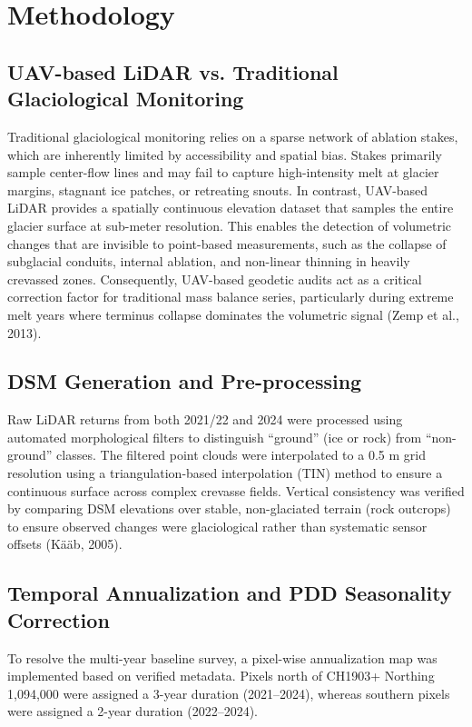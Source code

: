 \documentclass[12pt, a4paper]{article}
\begin{document}
	\section{Methodology}
	
	\subsection{UAV-based LiDAR vs. Traditional Glaciological Monitoring}
	Traditional glaciological monitoring relies on a sparse network of ablation stakes, which are inherently limited by accessibility and spatial bias. Stakes primarily sample center-flow lines and may fail to capture high-intensity melt at glacier margins, stagnant ice patches, or retreating snouts. In contrast, UAV-based LiDAR provides a spatially continuous elevation dataset that samples the entire glacier surface at sub-meter resolution. This enables the detection of volumetric changes that are invisible to point-based measurements, such as the collapse of subglacial conduits, internal ablation, and non-linear thinning in heavily crevassed zones. Consequently, UAV-based geodetic audits act as a critical correction factor for traditional mass balance series, particularly during extreme melt years where terminus collapse dominates the volumetric signal (Zemp et al., 2013).
	
	\subsection{DSM Generation and Pre-processing}
	Raw LiDAR returns from both 2021/22 and 2024 were processed using automated morphological filters to distinguish ``ground'' (ice or rock) from ``non-ground'' classes. The filtered point clouds were interpolated to a 0.5 m grid resolution using a triangulation-based interpolation (TIN) method to ensure a continuous surface across complex crevasse fields. Vertical consistency was verified by comparing DSM elevations over stable, non-glaciated terrain (rock outcrops) to ensure observed changes were glaciological rather than systematic sensor offsets (K\"{a}\"{a}b, 2005).
	
	\subsection{Temporal Annualization and PDD Seasonality Correction}
	To resolve the multi-year baseline survey, a pixel-wise annualization map was implemented based on verified metadata. Pixels north of CH1903+ Northing 1,094,000 were assigned a 3-year duration (2021--2024), whereas southern pixels were assigned a 2-year duration (2022--2024).
	
\end{document}
